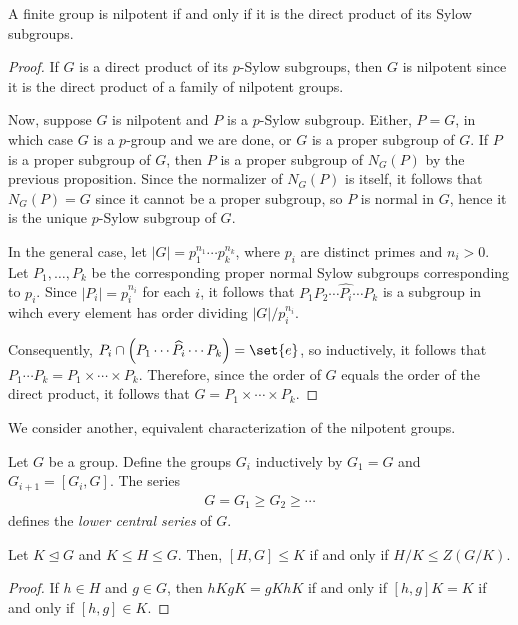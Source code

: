 \documentclass[10pt]{mypackage}
\begin{document}
\begin{proposition}
  A finite group is nilpotent if and only if it is the direct product of its Sylow subgroups.
\end{proposition}
\begin{proof}
  If $G$ is a direct product of its $p$-Sylow subgroups, then $G$ is nilpotent since it is the direct product of a family of nilpotent groups.

  Now, suppose $G$ is nilpotent and $P$ is a $p$-Sylow subgroup. Either, $P = G$, in which case $G$ is a $p$-group and we are done, or $G$ is a proper subgroup of $G$. If $P$ is a proper subgroup of $G$, then $P$ is a proper subgroup of $N_G(P)$ by the previous proposition. Since the normalizer of $N_G(P)$ is itself, it follows that $N_G(P) = G$ since it cannot be a proper subgroup, so $P$ is normal in $G$, hence it is the unique $p$-Sylow subgroup of $G$.

  In the general case, let $\left\vert G \right\vert = p_1^{n_1}\cdots p_k^{n_k}$, where $p_i$ are distinct primes and $n_i > 0$. Let $P_1,\dots,P_k$ be the corresponding proper normal Sylow subgroups corresponding to $p_i$. Since $\left\vert P_i \right\vert = p_i^{n_i}$ for each $i$, it follows that $P_1P_2\cdots \widehat{P_i}\cdots P_k$ is a subgroup in wihch every element has order dividing $\left\vert G \right\vert/p_i^{n_i}$.

  Consequently, $P_i\cap \left( P_1\cdots \widehat{P_i}\cdots P_k \right) = \set{e}$, so inductively, it follows that $P_1\cdots P_k = P_1\times\cdots\times P_k$. Therefore, since the order of $G$ equals the order of the direct product, it follows that $G = P_1\times\cdots\times P_k$.
\end{proof}
We consider another, equivalent characterization of the nilpotent groups.
\begin{definition}
  Let $G$ be a group. Define the groups $G_i$ inductively by $G_1 = G$ and $G_{i+1} = \left[ G_{i},G \right]$. The series
  \begin{align*}
    G = G_1 \geq G_2 \geq \cdots
  \end{align*}
  defines the \textit{lower central series} of $G$.
\end{definition}
\begin{lemma}
  Let $K\trianglelefteq G$ and $K\leq H \leq G$. Then, $\left[ H,G \right] \leq K$ if and only if $H/K \leq Z\left( G/K \right)$.
\end{lemma}
\begin{proof}
  If $h\in H$ and $g\in G$, then $hKgK = gKhK$ if and only if $\left[ h,g \right]K = K$ if and only if $\left[ h,g \right] \in K$.
\end{proof}
\end{document}
